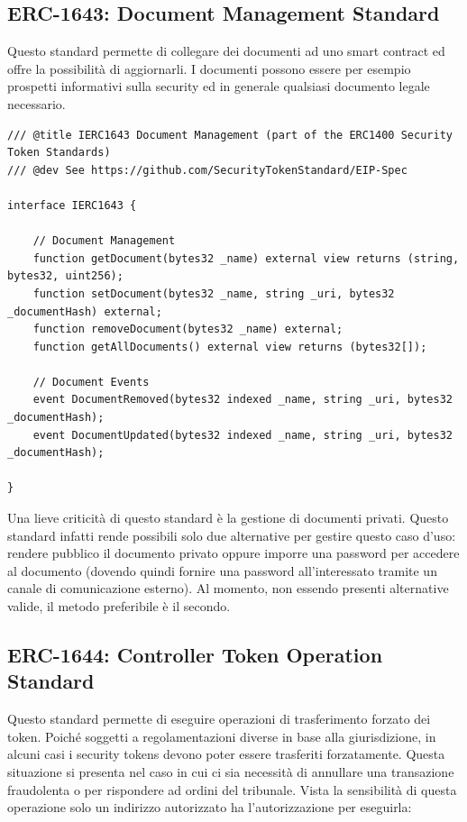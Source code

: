 \subsection{ERC-1643: Document Management Standard}
Questo standard permette di collegare dei documenti ad uno smart contract ed offre la possibilità di aggiornarli. I documenti possono essere per esempio prospetti informativi sulla security ed in generale qualsiasi documento legale necessario.
\begin{lstlisting}[language=Solidity,numbers=none]
/// @title IERC1643 Document Management (part of the ERC1400 Security Token Standards)
/// @dev See https://github.com/SecurityTokenStandard/EIP-Spec

interface IERC1643 {

    // Document Management
    function getDocument(bytes32 _name) external view returns (string, bytes32, uint256);
    function setDocument(bytes32 _name, string _uri, bytes32 _documentHash) external;
    function removeDocument(bytes32 _name) external;
    function getAllDocuments() external view returns (bytes32[]);

    // Document Events
    event DocumentRemoved(bytes32 indexed _name, string _uri, bytes32 _documentHash);
    event DocumentUpdated(bytes32 indexed _name, string _uri, bytes32 _documentHash);

}
\end{lstlisting}
Una lieve criticità di questo standard è la gestione di documenti privati. Questo standard infatti rende possibili solo due alternative per gestire questo caso d'uso: rendere pubblico il documento privato oppure imporre una password per accedere al documento (dovendo quindi fornire una password all'interessato tramite un canale di comunicazione esterno). Al momento, non essendo presenti alternative valide, il metodo preferibile è il secondo. 

\subsection{ERC-1644: Controller Token Operation Standard}
Questo standard permette di eseguire operazioni di trasferimento forzato dei token. Poiché soggetti a regolamentazioni diverse in base alla giurisdizione, in alcuni casi i security tokens devono poter essere trasferiti forzatamente. Questa situazione si presenta nel caso in cui ci sia necessità di annullare una transazione fraudolenta o per rispondere ad ordini del tribunale. Vista la sensibilità di questa operazione solo un indirizzo autorizzato ha l'autorizzazione per eseguirla:

